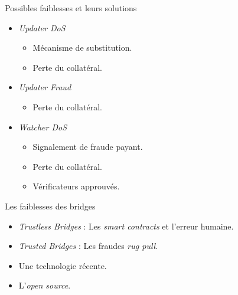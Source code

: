 \begin{frame}{Possibles faiblesses et leurs solutions}
\begin{itemize}
    \item \textit{Updater DoS}
        \begin{itemize}
            \item Mécanisme de substitution.
            \item Perte du collatéral.
        \end{itemize}
    \item \textit{Updater Fraud} \begin{itemize} \item Perte du collatéral. \end{itemize}
    \item \textit{Watcher DoS} 
        \begin{itemize}
            \item Signalement de fraude payant.
            \item Perte du collatéral.
            \item Vérificateurs approuvés.
        \end{itemize}
\end{itemize}
\end{frame}

\begin{frame}{Les faiblesses des bridges}
\begin{itemize}
    \item \textit{Trustless Bridges} : Les \textit{smart contracts} et l'erreur humaine.
    \item \textit{Trusted Bridges} : Les fraudes \textit{rug pull}.
    \item Une technologie récente.
    \item L'\textit{open source}.
\end{itemize}
\end{frame}
